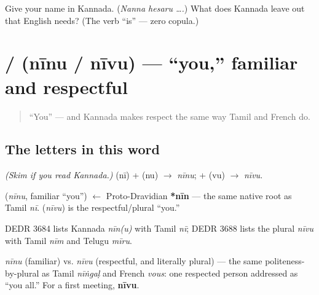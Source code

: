 \begin{tcolorbox}[breakable,colback=teal!4,colframe=teal!35!black,title={Before you move on}]
Give your name in Kannada. (\emph{Nanna hesaru ….}) What does Kannada leave out that English needs? (The verb \textquotedblleft{}is\textquotedblright{} — zero copula.)
\end{tcolorbox}
\section[\texorpdfstring{\kn{ನೀನು} / \kn{ನೀವು} (nīnu / nīvu)}{ನೀನು / ನೀವು (nīnu / nīvu)}]{ /  (nīnu / nīvu) — \textquotedblleft{}you,\textquotedblright{} familiar and respectful}

\label{lesson:KA-C02-niinu-niivu}



\begin{quote}
\textquotedblleft{}You\textquotedblright{} — and Kannada makes respect the same way Tamil and French do.
\end{quote}

\subsection*{The letters in this word}
\emph{(Skim if you read Kannada.)} \textbf{} (nī) + \textbf{} (nu) $\to$ \emph{nīnu}; \textbf{} + \textbf{} (vu) $\to$ \emph{nīvu}.

\begin{cousinweb}
\textbf{} (\emph{nīnu}, familiar \textquotedblleft{}you\textquotedblright{}) $\leftarrow$ Proto-Dravidian \textbf{*nīn} — the same native root as Tamil \emph{nī}. \textbf{} (\emph{nīvu}) is the respectful/plural \textquotedblleft{}you.\textquotedblright{}

DEDR 3684 lists Kannada \emph{nīn(u)} with Tamil \emph{nī}; DEDR 3688 lists the plural \emph{nīvu} with Tamil \emph{nīm} and Telugu \emph{mīru}.
\end{cousinweb}

\begin{grammarlens}[title={Grammar Lens: respect by the plural}]
\emph{nīnu} (familiar) vs. \emph{nīvu} (respectful, and literally plural) — the same politeness-by-plural as Tamil \emph{nīṅgaḷ} and French \emph{vous}: one respected person addressed as \textquotedblleft{}you all.\textquotedblright{} For a first meeting, \textbf{nīvu}.
\end{grammarlens}

